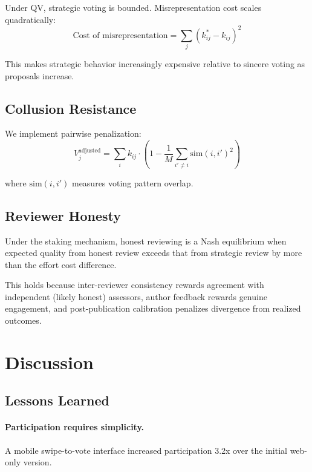 \documentclass[11pt,a4paper]{article}
\begin{document}
Under QV, strategic voting is bounded. Misrepresentation cost scales
quadratically:
\begin{equation}
  \text{Cost of misrepresentation} = \sum_j (k_{ij}^* - k_{ij})^2
\end{equation}

This makes strategic behavior increasingly expensive relative to sincere
voting as proposals increase.

\subsection{Collusion Resistance}

We implement pairwise penalization:
\begin{equation}
  V_j^{\text{adjusted}} = \sum_i k_{ij} \cdot \left(1 -
  \frac{1}{M} \sum_{i' \neq i} \text{sim}(i, i')^2\right)
\end{equation}

where $\text{sim}(i, i')$ measures voting pattern overlap.

\subsection{Reviewer Honesty}

\begin{proposition}
Under the staking mechanism, honest reviewing is a Nash equilibrium when
expected quality from honest review exceeds that from strategic review
by more than the effort cost difference.
\end{proposition}

This holds because inter-reviewer consistency rewards agreement with
independent (likely honest) assessors, author feedback rewards genuine
engagement, and post-publication calibration penalizes divergence from
realized outcomes.


\section{Discussion}
\label{sec:discussion}

\subsection{Lessons Learned}

\paragraph{Participation requires simplicity.} A mobile swipe-to-vote
interface increased participation 3.2x over the initial web-only version.
\end{document}
